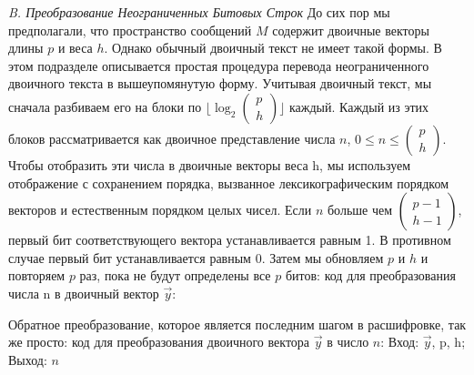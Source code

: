 \documentclass[a4paper,12pt]{article}
\newcommand{\DL}{\newline\newline}
\begin{document}
\textsl{B. Преобразование Неограниченных Битовых Строк} \newline
До сих пор мы предполагали, что пространство сообщений $M$ содержит двоичные векторы длины $p$ и веса $h$. Однако обычный двоичный текст не имеет такой формы. В этом подразделе описывается простая процедура перевода неограниченного двоичного текста в вышеупомянутую форму. \newline
\indent Учитывая двоичный текст, мы сначала разбиваем его на блоки по $\Big \lfloor \log_2 
\begin{pmatrix}
  p\\ 
  h
\end{pmatrix}
\Big \rfloor$ каждый. Каждый из этих блоков рассматривается как
двоичное представление числа $n$, $0 \leq n \leq \begin{pmatrix}p\\h\end{pmatrix}$. \newline
Чтобы отобразить эти числа в двоичные векторы веса h, мы используем отображение с сохранением порядка, вызванное лексикографическим порядком векторов и естественным порядком целых чисел. Если $n$ больше чем $\begin{pmatrix}p-1\\h-1\end{pmatrix}$, первый бит соответствующего вектора устанавливается равным 1. В противном случае первый бит устанавливается равным 0. Затем мы обновляем $p$ и $h$ и повторяем $p$ раз, пока не будут определены все $p$ битов: \DL
\indent код для преобразования числа n в двоичный вектор $\Vec{y}$:
\begin{algorithmic}[1]
\Else
{}
\EndIf
\EndFor
{}
\end{algorithmic}

Обратное преобразование, которое является последним шагом в расшифровке, так же просто: \newline
\indent код для преобразования двоичного вектора $\Vec{y}$ в число $n$:\newline
\indent Вход: {$\Vec{y}$, p, h}; Выход: $n$
\end{document}
